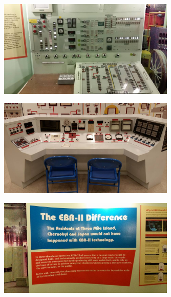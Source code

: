\documentclass[aspectratio=1610,pdftex,dvipsnames,compress,xcolor={dvipsnames}]{beamer}
\begin{document}
\addtocounter{framenumber}{-1} 
\begin{frame}{}
    \begin{figure}
        \centering
        \includegraphics[width=0.75\textwidth]{ebr1.jpg}
    \end{figure}
\end{frame}


\begin{frame}{}
    \begin{figure}
        \centering
        \includegraphics[width=0.75\textwidth]{ebr2.jpg}
    \end{figure}
\end{frame}


\begin{frame}{}
    \begin{figure}
        \centering
        \includegraphics[width=0.75\textwidth]{ebr3.jpg}
    \end{figure}
\end{frame}
\end{document}
